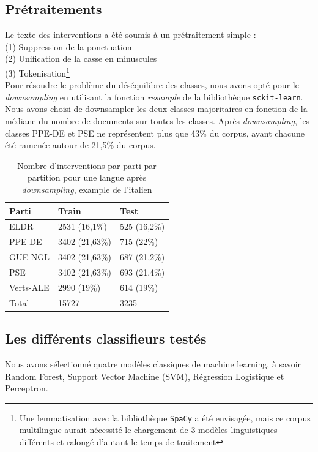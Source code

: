 \subsection{Prétraitements}
Le texte des interventions a été soumis à un prétraitement simple :\\
\indent(1) Suppression de la ponctuation\\
\indent(2) Unification de la casse en minuscules\\
\indent(3) Tokenisation\footnote {Une lemmatisation avec la bibliothèque \texttt{SpaCy} a été envisagée,
mais ce corpus multilingue aurait nécessité le chargement de 3 modèles linguistiques
différents et ralongé d'autant le temps de traitement}
\\
Pour résoudre le problème du déséquilibre des classes, nous avons opté pour le 
\textit{downsampling} en utilisant la fonction \textit{resample} de la bibliothèque \texttt{sckit-learn}. Nous avons choisi de downsampler les deux classes majoritaires en fonction de la médiane du nombre de documents sur toutes les classes. Après \textit{downsampling},
les classes PPE-DE et PSE ne représentent plus que 43\% du corpus, ayant chacune été ramenée autour de 21,5\% du corpus.

\begin{table}[ht]
    \centering
\begin{tabular}{|l|l|l|}
\hline
Parti & Train & Test\\ \hline
ELDR & 2531 (16,1\%) & 525 (16,2\%) \\ \hline
PPE-DE & 3402 (21,63\%) & 715 (22\%) \\ \hline
GUE-NGL & 3402 (21,63\%) & 687 (21,2\%) \\ \hline
PSE & 3402 (21,63\%) & 693 (21,4\%) \\ \hline
Verts-ALE & 2990 (19\%) & 614 (19\%)\\ \hline
Total & 15727 & 3235\\ \hline
\end{tabular}
\caption{Nombre d'interventions par parti par partition pour une langue après \textit{downsampling}, example de l'italien}
\label{tab:stats_downsampled}
\end{table}

\subsection{Les différents classifieurs testés}

Nous avons sélectionné quatre modèles classiques de machine learning, à savoir Random Forest, Support Vector Machine (SVM),  Régression Logistique et Perceptron.

